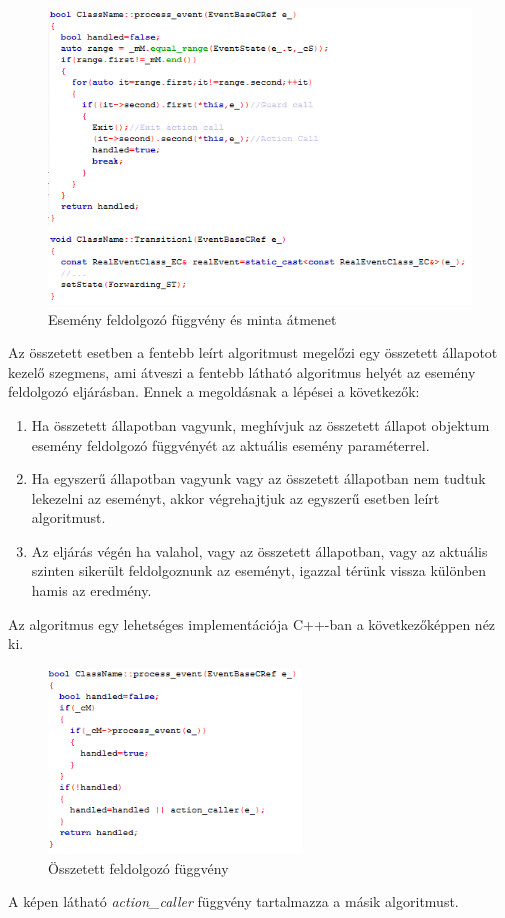 \documentclass[a4paper,12pt]{report}
\begin{document}
\begin{figure}[hbtp]
\centering
\includegraphics[width=1\textwidth]{specat.png}
\caption{Esemény feldolgozó függvény és minta átmenet}
\label{fig:esp}
\end{figure}

Az összetett esetben a fentebb leírt algoritmust megelőzi egy összetett állapotot kezelő szegmens, ami átveszi a fentebb látható algoritmus helyét az esemény feldolgozó eljárásban. Ennek a megoldásnak a lépései a következők:
\begin{enumerate}
\item Ha összetett állapotban vagyunk, meghívjuk az összetett állapot objektum esemény feldolgozó függvényét az aktuális esemény paraméterrel.
\item Ha egyszerű állapotban vagyunk vagy az összetett állapotban nem tudtuk lekezelni az eseményt, akkor végrehajtjuk az egyszerű esetben leírt algoritmust.
\item Az eljárás végén ha valahol, vagy az összetett állapotban, vagy az aktuális szinten sikerült feldolgoznunk az eseményt, igazzal térünk vissza különben hamis az eredmény.
\end{enumerate}
Az algoritmus egy lehetséges implementációja C++-ban a következőképpen néz ki.

\begin{figure}[hbtp]
\centering
\includegraphics[width=0.6\textwidth]{ospec.png}
\caption{Összetett feldolgozó függvény}
\label{fig:peac}
\end{figure}
A képen látható {\it action\_caller} függvény tartalmazza a másik algoritmust.
\end{document}

